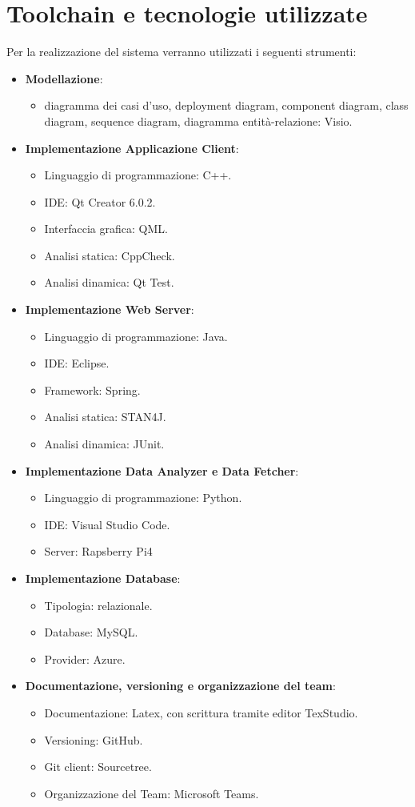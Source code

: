 \section{Toolchain e tecnologie utilizzate}
Per la realizzazione del sistema verranno utilizzati i seguenti strumenti:
\begin{itemize}
	\item \textbf{Modellazione}:
	\begin{itemize}
		\item diagramma dei casi d'uso, deployment diagram, component diagram, class
		diagram, sequence diagram, diagramma entità-relazione: Visio.
	\end{itemize}
	\item \textbf{Implementazione Applicazione Client}:
	\begin{itemize}
		\item Linguaggio di programmazione: C++.
		\item IDE: Qt Creator 6.0.2.
		\item Interfaccia grafica: QML.
		\item Analisi statica: CppCheck.
		\item Analisi dinamica: Qt Test.
	\end{itemize}
	\item \textbf{Implementazione Web Server}:
	\begin{itemize}
		\item Linguaggio di programmazione: Java.
		\item IDE: Eclipse.
		\item Framework: Spring.
		\item Analisi statica: STAN4J.
		\item Analisi dinamica: JUnit.
	\end{itemize}
	\item \textbf{Implementazione Data Analyzer e Data Fetcher}:
	\begin{itemize}
		\item Linguaggio di programmazione: Python.
		\item IDE: Visual Studio Code.
		\item Server: Rapsberry Pi4
	\end{itemize}
	\item \textbf{Implementazione Database}:
	\begin{itemize}
		\item Tipologia: relazionale.
		\item Database: MySQL.
		\item Provider: Azure.
	\end{itemize}
	\item \textbf{Documentazione, versioning e organizzazione del team}:
	\begin{itemize}
		\item Documentazione: Latex, con scrittura tramite editor TexStudio.
		\item Versioning: GitHub.
		\item Git client: Sourcetree.
		\item Organizzazione del Team: Microsoft Teams.
	\end{itemize}
\end{itemize}